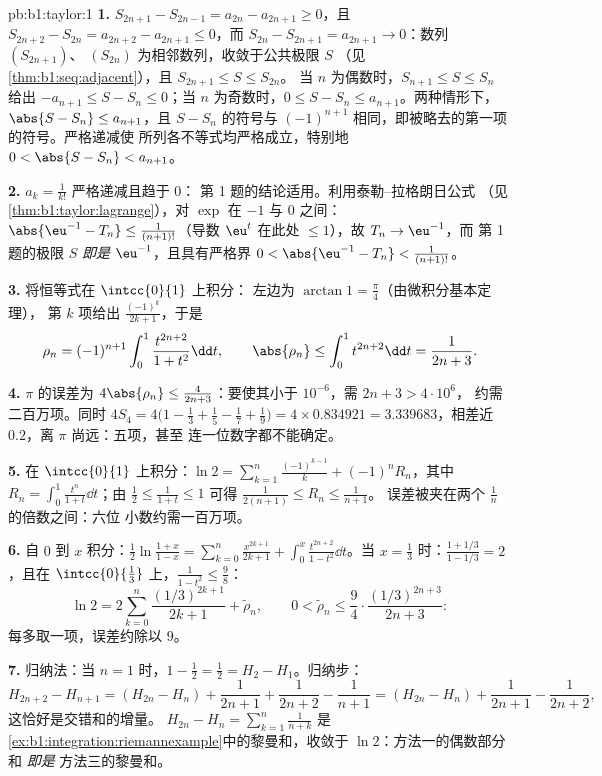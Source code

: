 \begin{solution}{pb:b1:taylor:1}
\textbf{1.} $S_{2n+1} - S_{2n-1} = a_{2n} - a_{2n+1} \geq 0$，且
$S_{2n+2} - S_{2n} = a_{2n+2} - a_{2n+1} \leq 0$，而 $S_{2n}
- S_{2n+1} = a_{2n+1} \to 0$：数列 $(S_{2n+1})$、
$(S_{2n})$ 为相邻数列，收敛于公共极限 $S$
（见\cref{thm:b1:seq:adjacent}），且 $S_{2n+1} \leq S \leq S_{2n}$。
当 $n$ 为偶数时，$S_{n+1} \leq S \leq S_n$ 给出 $-a_{n+1} \leq S -
S_n \leq 0$；当 $n$ 为奇数时，$0 \leq S - S_n \leq a_{n+1}$。两种情形下，
$\abs{S - S_n} \leq a_{n+1}$，且 $S - S_n$ 的符号与
$(-1)^{n+1}$ 相同，即被略去的第一项的符号。严格递减使
所列各不等式均严格成立，特别地 $0 < \abs{S -
S_n} < a_{n+1}$。

\textbf{2.} $a_k = \frac{1}{k!}$ 严格递减且趋于 $0$：
第 1 题的结论适用。利用泰勒–拉格朗日公式
（见\cref{thm:b1:taylor:lagrange}），对 $\exp$ 在 $-1$ 与 $0$ 之间：
$\abs{\eu^{-1} - T_n} \leq \frac{1}{(n+1)!}$（导数
$\eu^t$ 在此处 $\leq 1$），故 $T_n \to \eu^{-1}$，而
第 1 题的极限 $S$ \emph{即是} $\eu^{-1}$，且具有严格界
$0 < \abs{\eu^{-1} - T_n} < \frac{1}{(n+1)!}$。

\textbf{3.} 将恒等式在 $\intcc{0}{1}$ 上积分：
左边为 $\arctan 1 = \frac\pi4$（由微积分基本定理），
第 $k$ 项给出 $\frac{(-1)^k}{2k+1}$，于是
\[
\rho_n = (-1)^{n+1}\int_0^1 \frac{t^{2n+2}}{1+t^2}\dd t,
\qquad
\abs{\rho_n} \leq \int_0^1 t^{2n+2}\dd t = \frac{1}{2n+3} .
\]

\textbf{4.} $\pi$ 的误差为 $4\abs{\rho_n} \leq
\frac{4}{2n+3}$：要使其小于 $10^{-6}$，需 $2n + 3 > 4\cdot10^6$，
约需二百万项。同时 $4S_4 = 4\bigl(1 - \frac13 +
\frac15 - \frac17 + \frac19\bigr) = 4 \times 0.834921 =
3.339683$，相差近 $0.2$，离 $\pi$ 尚远：五项，甚至
连一位数字都不能确定。

\textbf{5.} 在 $\intcc{0}{1}$ 上积分：$\ln 2 =
\sum_{k=1}^{n} \frac{(-1)^{k-1}}{k} + (-1)^n R_n$，其中 $R_n =
\int_0^1 \frac{t^n}{1+t}\dd t$；由 $\frac12 \leq \frac{1}{1+t}
\leq 1$ 可得 $\frac{1}{2(n+1)} \leq R_n \leq \frac{1}{n+1}$。
误差被夹在两个 $\frac1n$ 的倍数之间：六位
小数约需一百万项。

\textbf{6.} 自 $0$ 到 $x$ 积分：$\frac12\ln\frac{1 +
x}{1 - x} = \sum_{k=0}^{n} \frac{x^{2k+1}}{2k+1} + \int_0^x
\frac{t^{2n+2}}{1-t^2}\dd t$。当 $x = \frac13$ 时：$\frac{1 +
1/3}{1 - 1/3} = 2$，且在 $\intcc{0}{\frac13}$ 上，$\frac{1}{1 -
t^2} \leq \frac98$：
\[
\ln 2 = 2\sum_{k=0}^{n} \frac{(1/3)^{2k+1}}{2k+1} +
\tilde\rho_n,
\qquad
0 < \tilde\rho_n \leq \frac{9}{4}\cdot
\frac{(1/3)^{2n+3}}{2n+3} :
\]
每多取一项，误差约除以 $9$。

\textbf{7.} 归纳法：当 $n = 1$ 时，$1 - \frac12 = \frac12 = H_2
- H_1$。归纳步：
\[
H_{2n+2} - H_{n+1} = (H_{2n} - H_n) + \frac{1}{2n+1} +
\frac{1}{2n+2} - \frac{1}{n+1}
= (H_{2n} - H_n) + \frac{1}{2n+1} - \frac{1}{2n+2},
\]
这恰好是交错和的增量。
$H_{2n} - H_n = \sum_{k=1}^{n}\frac{1}{n+k}$ 是
\cref{ex:b1:integration:riemannexample}中的黎曼和，收敛于 $\ln
2$：方法一的偶数部分和 \emph{即是}
方法三的黎曼和。


\end{solution}
